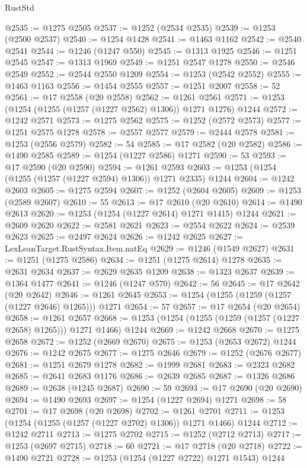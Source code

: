 \begin{lexlean}{RustStd}
\begin{coremodule}
@2535 := @1275 @2505
@2537 := @1252 (@2534 @2535)
@2539 := @1253 (@2500 @2537)
@2540 := @1254 @1428
@2541 := @1463 @1162
@2542 := @2540 @2541
@2544 := @1246 (@1247 @550)
@2545 := @1313 @1925
@2546 := @1251 @2545
@2547 := @1313 @1969
@2549 := @1251 @2547 @1278
@2550 := @2546 @2549
@2552 := @2544 @2550 @1209
@2554 := @1253 (@2542 @2552)
@2555 := @1463 @1163
@2556 := @1454 @2555
@2557 := @1251 @2007
@2558 := 52
@2561 := @17 @2558 (@20 @2558)
@2562 := @1261 @2561
@2571 := @1253 (@1254 (@1255 (@1257 (@1227 @2562) @1306)) @1271 @1276) @1244
@2572 := @1242 @2571
@2573 := @1275 @2562
@2575 := @1252 (@2572 @2573)
@2577 := @1251 @2575 @1278
@2578 := @2557 @2577
@2579 := @2444 @2578
@2581 := @1253 (@2556 @2579)
@2582 := 54
@2585 := @17 @2582 (@20 @2582)
@2586 := @1490 @2585
@2589 := @1254 (@1227 @2586) @1271
@2590 := 53
@2593 := @17 @2590 (@20 @2590)
@2594 := @1261 @2593
@2603 := @1253 (@1254 (@1255 (@1257 (@1227 @2594) @1306)) @1271 @2335) @1244
@2604 := @1242 @2603
@2605 := @1275 @2594
@2607 := @1252 (@2604 @2605)
@2609 := @1253 (@2589 @2607)
@2610 := 55
@2613 := @17 @2610 (@20 @2610)
@2614 := @1490 @2613
@2620 := @1253 (@1254 (@1227 @2614) @1271 @1415) @1244
@2621 := @2609 @2620
@2622 := @2581 @2621
@2623 := @2554 @2622
@2624 := @2539 @2623
@2625 := @2497 @2624
@2626 := @1242 @2625
@2627 := LexLeanTarget.RustSyntax.Item.natEq
@2629 := @1246 (@1549 @2627)
@2631 := @1251 (@1275 @2586)
@2634 := @1251 (@1275 @2614) @1278
@2635 := @2631 @2634
@2637 := @2629 @2635 @1209
@2638 := @1323 @2637
@2639 := @1364 @1477
@2641 := @1246 (@1247 @570)
@2642 := 56
@2645 := @17 @2642 (@20 @2642)
@2646 := @1261 @2645
@2653 := @1254 (@1255 (@1259 (@1257 (@1227 @2646) @1265))) @1271
@2654 := 57
@2657 := @17 @2654 (@20 @2654)
@2658 := @1261 @2657
@2668 := @1253 (@1254 (@1255 (@1259 (@1257 (@1227 @2658) @1265))) @1271 @1466) @1244
@2669 := @1242 @2668
@2670 := @1275 @2658
@2672 := @1252 (@2669 @2670)
@2675 := @1253 (@2653 @2672) @1244
@2676 := @1242 @2675
@2677 := @1275 @2646
@2679 := @1252 (@2676 @2677)
@2681 := @1251 @2679 @1278
@2682 := @1999 @2681
@2683 := @2323 @2682
@2685 := @2641 @2683 @1176
@2686 := @2639 @2685
@2687 := @1326 @2686
@2689 := @2638 (@1245 @2687)
@2690 := 59
@2693 := @17 @2690 (@20 @2690)
@2694 := @1490 @2693
@2697 := @1254 (@1227 @2694) @1271
@2698 := 58
@2701 := @17 @2698 (@20 @2698)
@2702 := @1261 @2701
@2711 := @1253 (@1254 (@1255 (@1257 (@1227 @2702) @1306)) @1271 @1466) @1244
@2712 := @1242 @2711
@2713 := @1275 @2702
@2715 := @1252 (@2712 @2713)
@2717 := @1253 (@2697 @2715)
@2718 := 60
@2721 := @17 @2718 (@20 @2718)
@2722 := @1490 @2721
@2728 := @1253 (@1254 (@1227 @2722) @1271 @1543) @1244

\end{coremodule}
\end{lexlean}

